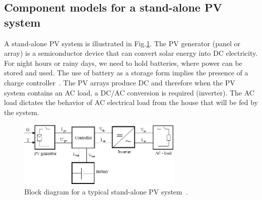 \documentclass[review]{elsarticle}
\begin{document}
\subsection{Component models for a stand-alone PV system }
A stand-alone PV system is illustrated in Fig.\ref{fig:blockdiagram}. The PV generator (panel or array) is a semiconductor device that can convert solar energy into DC electricity. %
For night hours or rainy days, we need to hold batteries, where power can be stored and used. The use of battery as a storage form implies the presence of a charge controller~\cite{Hansen}. The PV arrays produce DC and therefore when the PV system contains an AC load, a DC/AC conversion is required (inverter). The AC load dictates the behavior of AC electrical load from the house that will be fed by the system.
%
%
\begin{figure}[h]
\includegraphics[width=0.70\textwidth]{blockdiagramPVS2}
\centering
\caption{Block diagram for a typical stand-alone PV system~\cite{Hansen}.}
\label{fig:blockdiagram}
\end{figure}
%
\end{document}
